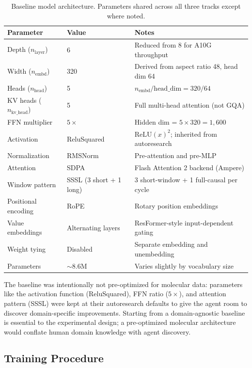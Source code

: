 \begin{table}[t]
\centering
\caption{Baseline model architecture. Parameters shared across all three tracks except where noted.}
\label{tab:baseline_arch}
\small
\begin{tabular}{@{}llp{6.5cm}@{}}
\toprule
\textbf{Parameter} & \textbf{Value} & \textbf{Notes} \\
\midrule
Depth ($n_\text{layer}$) & 6 & Reduced from 8 for A10G throughput \\
Width ($n_\text{embd}$) & 320 & Derived from aspect ratio 48, head dim 64 \\
Heads ($n_\text{head}$) & 5 & $n_\text{embd} / \text{head\_dim} = 320 / 64$ \\
KV heads ($n_\text{kv\_head}$) & 5 & Full multi-head attention (not GQA) \\
FFN multiplier & $5\times$ & Hidden dim = $5 \times 320 = 1{,}600$ \\
Activation & ReluSquared & $\text{ReLU}(x)^2$; inherited from autoresearch \\
Normalization & RMSNorm & Pre-attention and pre-MLP \\
Attention & SDPA & Flash Attention 2 backend (Ampere) \\
Window pattern & SSSL (3 short + 1 long) & 3 short-window + 1 full-causal per cycle \\
Positional encoding & RoPE & Rotary position embeddings \\
Value embeddings & Alternating layers & ResFormer-style input-dependent gating \\
Weight tying & Disabled & Separate embedding and unembedding \\
Parameters & ${\sim}$8.6M & Varies slightly by vocabulary size \\
\bottomrule
\end{tabular}
\end{table}

The baseline was intentionally not pre-optimized for molecular data: parameters like the activation function (ReluSquared), FFN ratio ($5\times$), and attention pattern (SSSL) were kept at their autoresearch defaults to give the agent room to discover domain-specific improvements. Starting from a domain-agnostic baseline is essential to the experimental design; a pre-optimized molecular architecture would conflate human domain knowledge with agent discovery.

\subsection{Training Procedure}
\label{sec:training_procedure}

